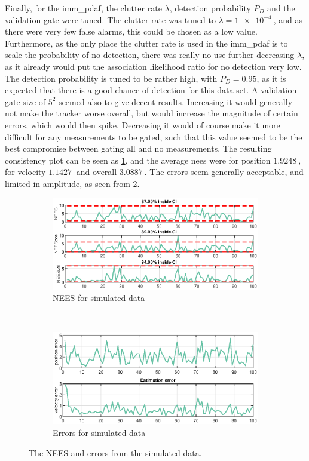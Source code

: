 Finally, for the \acrshort{imm_pdaf}, the clutter rate $\lambda$, detection probability $P_D$ and the validation gate were tuned. The clutter rate was tuned to $\lambda = \SI{1e-4}{}$, and as there were very few false alarms, this could be chosen as a low value. Furthermore, as the only place the clutter rate is used in the \acrshort{imm_pdaf} is to scale the probability of no detection, there was really no use further decreasing $\lambda$, as it already would put the association likelihood ratio for no detection very low. The detection probability is tuned to be rather high, with $P_D = 0.95$, as it is expected that there is a good chance of detection for this data set. A validation gate size of $5^2$ seemed also to give decent results. Increasing it would generally not make the tracker worse overall, but would increase the magnitude of certain errors, which would then spike. Decreasing it would of course make it more difficult for any measurements to be gated, such that this value seemed to be the best compromise between gating all and no measurements. The resulting consistency plot can be seen as \cref{fig:ga_1_2_NEES}, and the average \acrshort{nees} were for position $\SI{1.9248}{}$, for velocity $\SI{1.1427}{}$ and overall $\SI{3.0887}{}$. The errors seem generally acceptable, and limited in amplitude, as seen from \cref{fig:ga_1_2_error}. 

\begin{figure}[ht]
    \centering
	\begin{subfigure}[h]{0.4\textwidth}
		\includegraphics[width=\textwidth]{figures/ga_1/2_NEES}
		\caption{NEES for simulated data}
		\label{fig:ga_1_2_NEES}
    \end{subfigure}%
    ~
    \begin{subfigure}[h]{0.4\textwidth}
        \includegraphics[width=\textwidth]{figures/ga_1/2_error}
        \caption{Errors for simulated data}
        \label{fig:ga_1_2_error}
    \end{subfigure}
    \caption{The NEES and errors from the simulated data. }
    \label{fig:ga_1_2_NEES_and_error} 
\end{figure}

